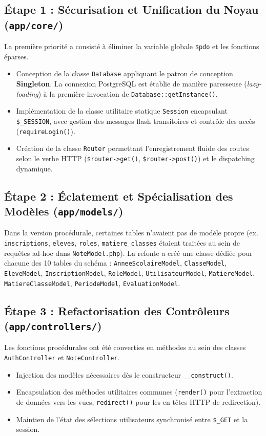 \documentclass[11pt,a4paper,oneside]{report}
\begin{document}
\subsection{Étape 1 : Sécurisation et Unification du Noyau (\texttt{app/core/})}
La première priorité a consisté à éliminer la variable globale \texttt{\$pdo} et les fonctions éparses.
\begin{itemize}[label=\textcolor{primaryMed}{\textbullet}]
    \item Conception de la classe \texttt{Database} appliquant le patron de conception \textbf{Singleton}. La connexion PostgreSQL est établie de manière paresseuse (\textit{lazy-loading}) à la première invocation de \texttt{Database::getInstance()}.
    \item Implémentation de la classe utilitaire statique \texttt{Session} encapsulant \texttt{\$\_SESSION}, avec gestion des messages flash transitoires et contrôle des accès (\texttt{requireLogin()}).
    \item Création de la classe \texttt{Router} permettant l'enregistrement fluide des routes selon le verbe HTTP (\texttt{\$router->get()}, \texttt{\$router->post()}) et le dispatching dynamique.
\end{itemize}

\subsection{Étape 2 : Éclatement et Spécialisation des Modèles (\texttt{app/models/})}
Dans la version procédurale, certaines tables n'avaient pas de modèle propre (ex. \texttt{inscriptions}, \texttt{eleves}, \texttt{roles}, \texttt{matiere\_classes} étaient traitées au sein de requêtes ad-hoc dans \texttt{NoteModel.php}).
La refonte a créé une classe dédiée pour chacune des 10 tables du schéma : \texttt{AnneeScolaireModel}, \texttt{ClasseModel}, \texttt{EleveModel}, \texttt{InscriptionModel}, \texttt{RoleModel}, \texttt{UtilisateurModel}, \texttt{MatiereModel}, \texttt{MatiereClasseModel}, \texttt{PeriodeModel}, \texttt{EvaluationModel}.

\subsection{Étape 3 : Refactorisation des Contrôleurs (\texttt{app/controllers/})}
Les fonctions procédurales ont été converties en méthodes au sein des classes \texttt{AuthController} et \texttt{NoteController}.
\begin{itemize}[label=\textcolor{primaryMed}{\textbullet}]
    \item Injection des modèles nécessaires dès le constructeur \texttt{\_\_construct()}.
    \item Encapsulation des méthodes utilitaires communes (\texttt{render()} pour l'extraction de données vers les vues, \texttt{redirect()} pour les en-têtes HTTP de redirection).
    \item Maintien de l'état des sélections utilisateurs synchronisé entre \texttt{\$\_GET} et la session.
\end{itemize}
\end{document}
